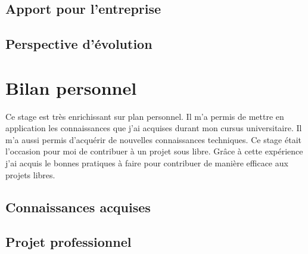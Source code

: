 \subsection{Apport pour l'entreprise}
\lipsum[14]
\lipsum[5]
\subsection{Perspective d'évolution}
\lipsum[14]
\lipsum[5]

\section{Bilan personnel}
Ce stage est très enrichissant sur plan personnel. Il m'a permis de mettre en application les connaissances que j'ai acquises durant mon cursus universitaire. Il m'a aussi permis d'acquérir de nouvelles connaissances techniques. Ce stage était l'occasion pour moi de contribuer à un projet sous libre. Grâce à cette expérience j'ai acquis le bonnes pratiques à faire pour contribuer de manière efficace aux projets libres.  
\subsection{Connaissances acquises}
\lipsum[14]
\lipsum[5]
\subsection{Projet professionnel}
\lipsum[14]
\lipsum[5]
